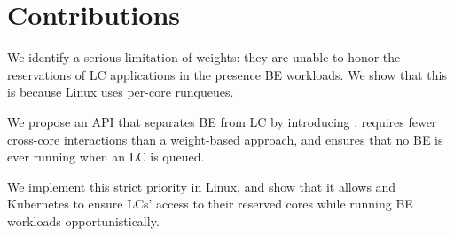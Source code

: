 \section{Contributions}

We identify a serious limitation of \cgroups{} weights: they are unable to honor
the reservations of LC applications in the presence BE workloads. We show that
this is because Linux uses per-core runqueues.

We propose an API that separates BE from LC by introducing \beclass{}.
\beclass{} requires fewer cross-core interactions than a weight-based approach,
and ensures that no BE is ever running when an LC is queued.

We implement this strict priority in Linux, and show that it allows \cgroups{}
and Kubernetes to ensure LCs' access to their reserved cores while running BE
workloads opportunistically.
